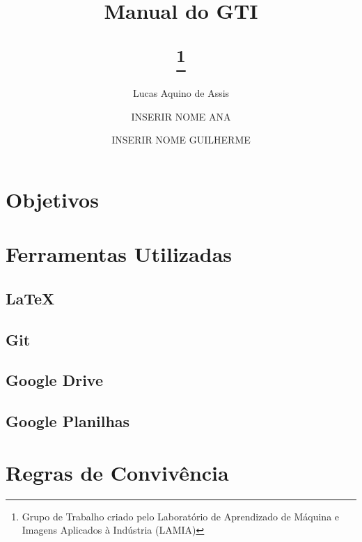 \documentclass{article}
\title{Manual do GTI
	\author{
		Lucas Aquino de Assis
		\and
		INSERIR NOME ANA
		\and
		INSERIR NOME GUILHERME
	}
	\thanks{Grupo de Trabalho criado pelo Laboratório de Aprendizado de Máquina e Imagens Aplicados à Indústria (LAMIA)}
}
\begin{document}
\begin{titlepage}
\maketitle
\end{titlepage}

\tableofcontents

\section{Objetivos}

\section{Ferramentas Utilizadas}
\subsection{LaTeX}


\subsection{Git}


\subsection{Google Drive}


\subsection{Google Planilhas}


\section{Regras de Convivência}
\end{document}
